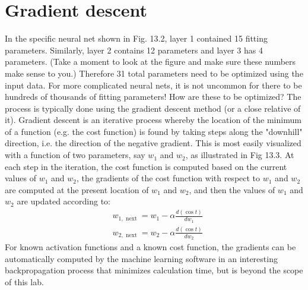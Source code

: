 \section*{Gradient descent}
In the specific neural net shown in Fig. 13.2, layer 1 contained 15 fitting parameters. Similarly, layer 2 contains 12 parameters and layer 3 has 4 parameters. (Take a moment to look at the figure and make sure these numbers make sense to you.) Therefore 31 total parameters need to be optimized using the input data. For more complicated neural nets, it is not uncommon for there to be hundreds of thousands of fitting parameters! How are these to be optimized? The process is typically done using the gradient descent method (or a close relative of it).
Gradient descent is an iterative process whereby the location of the minimum of a function (e.g. the cost function) is found by taking steps along the "downhill" direction, i.e. the direction of the negative gradient. This is most easily visualized with a function of two parameters, say $w_{1}$ and $w_{2}$, as illustrated in Fig 13.3.
At each step in the iteration, the cost function is computed based on the current values of $w_{1}$ and $w_{2}$, the gradients of the cost function with respect to $w_{1}$ and $w_{2}$ are computed at the present location of $w_{1}$ and $w_{2}$, and then the values of $w_{1}$ and $w_{2}$ are updated according to:
\begin{equation*}
\begin{aligned}
&w_{1, \text { next }}=w_{1}-\alpha \frac{d(\cos t)}{d w_{1}} \\
&w_{2, \text { next }}=w_{2}-\alpha \frac{d(\cos t)}{d w_{2}}
\end{aligned}
\end{equation*}
For known activation functions and a known cost function, the gradients can be automatically computed by the machine learning software in an interesting backpropagation process that minimizes calculation time, but is beyond the scope of this lab.


